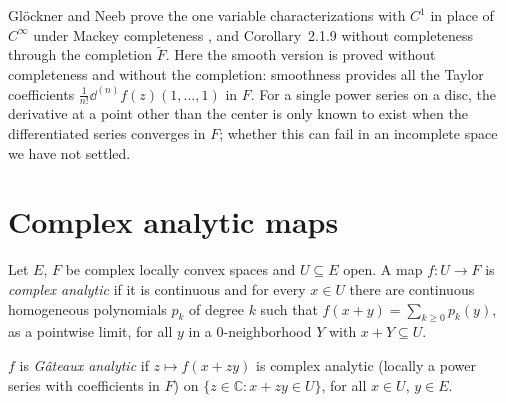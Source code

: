 \begin{remark}
  Glöckner and Neeb prove the one variable characterizations with $C^1$ in place of $C^\infty$
  under Mackey completeness \cite[Prop.~2.1.6]{GN26}, and Corollary~2.1.9 without completeness
  through the completion $\widetilde F$. Here the smooth version is proved without completeness
  and without the completion: smoothness provides all the Taylor coefficients
  $\frac{1}{n!}\dd^{(n)} f(z)(1, \dots, 1)$ in $F$. For a single power series on a disc, the
  derivative at a point other than the center is only known to exist when the differentiated
  series converges in $F$; whether this can fail in an incomplete space we have not settled.
\end{remark}

\section{Complex analytic maps}

\begin{definition}
  \label{def:complex-analytic}
  \leanok
  Let $E$, $F$ be complex locally convex spaces and $U \subseteq E$ open. A map
  $f \colon U \to F$ is \emph{complex analytic} if it is continuous and for every $x \in U$ there
  are continuous homogeneous polynomials $p_k$ of degree $k$ such that
  $f(x + y) = \sum_{k \ge 0} p_k(y)$, as a pointwise limit, for all $y$ in a $0$-neighborhood $Y$
  with $x + Y \subseteq U$.
\end{definition}

\begin{definition}
  \label{def:gateaux-analytic}
  \leanok
  $f$ is \emph{Gâteaux analytic} if $z \mapsto f(x + z y)$ is complex analytic (locally a power
  series with coefficients in $F$) on $\{z \in \mathbb{C} : x + zy \in U\}$, for all $x \in U$,
  $y \in E$.
\end{definition}

